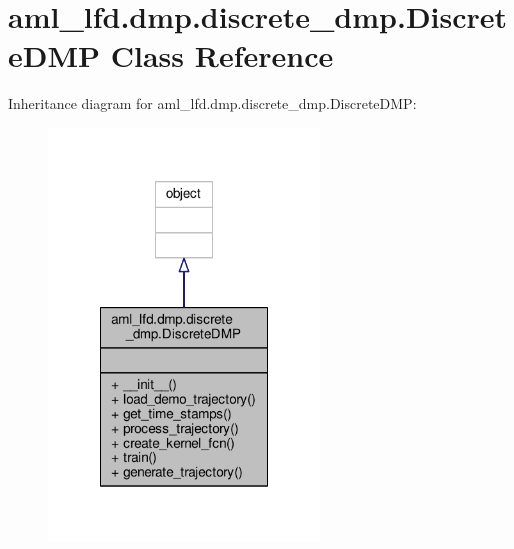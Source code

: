 \hypertarget{classaml__lfd_1_1dmp_1_1discrete__dmp_1_1_discrete_d_m_p}{\section{aml\-\_\-lfd.\-dmp.\-discrete\-\_\-dmp.\-Discrete\-D\-M\-P Class Reference}
\label{classaml__lfd_1_1dmp_1_1discrete__dmp_1_1_discrete_d_m_p}
}


Inheritance diagram for aml\-\_\-lfd.\-dmp.\-discrete\-\_\-dmp.\-Discrete\-D\-M\-P\-:\nopagebreak
\begin{figure}[H]
\begin{center}
\leavevmode
\includegraphics[width=204pt]{classaml__lfd_1_1dmp_1_1discrete__dmp_1_1_discrete_d_m_p__inherit__graph}
\end{center}
\end{figure}


